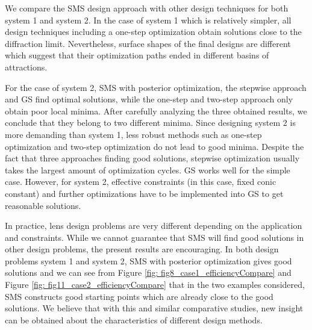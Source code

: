 We compare the SMS design approach with other design techniques for both system 1 and system 2. In the case of system 1 which is relatively simpler, all design techniques including a one-step optimization obtain solutions close to the diffraction limit. Nevertheless, surface shapes of the final designs are different which suggest that their optimization paths ended in different basins of attractions. 

For the case of system 2, SMS with posterior optimization, the stepwise approach and GS find optimal solutions, while the one-step and two-step approach only obtain poor local minima. After carefully analyzing the three obtained results, we conclude that they belong to two different minima. Since designing system 2 is more demanding than system 1, less robust methods such as one-step optimization and two-step optimization do not lead to good minima. Despite the fact that three approaches finding good solutions, stepwise optimization usually takes the largest amount of optimization cycles. GS works well for the simple case. However, for system 2, effective constraints (in this case, fixed conic constant) and further optimizations have to be implemented into GS to get reasonable solutions. 

In practice, lens design problems are very different depending on the application and constraints. While we cannot guarantee that SMS will find good solutions in other design problems, the present results are encouraging. In both design problems system 1 and system 2, SMS with posterior optimization gives good solutions and we can see from Figure \ref{fig: fig8_case1_efficiencyCompare} and Figure \ref{fig: fig11_case2_efficiencyCompare} that in the two examples considered, SMS constructs good starting points which are already close to the good solutions. We believe that with this and similar comparative studies, new insight can be obtained about the characteristics of different design methods. 



